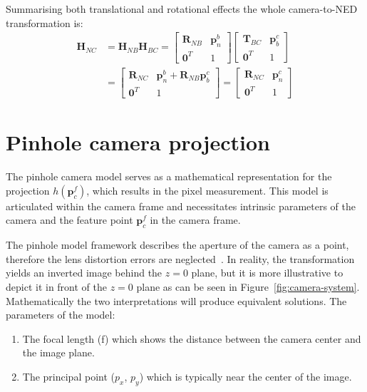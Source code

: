 Summarising both translational and rotational effects the whole camera-to-NED transformation is:
\begin{equation}
\begin{aligned}
    \mathbf{H}_{NC}&=\mathbf{H}_{NB}\mathbf{H}_{BC} = 
    \begin{bmatrix}
        \mathbf{R}_{NB} & \mathbf{p}_{n}^b\\
        \mathbf{0}^T & 1
    \end{bmatrix} 
    \begin{bmatrix}
        \mathbf{T}_{BC} & \mathbf{p}_b^c\\
        \mathbf{0}^T & 1
    \end{bmatrix} \\ &=
    \begin{bmatrix}
        \mathbf{R}_{NC} & \mathbf{p}_n^b+\mathbf{R}_{NB}\mathbf{p}_b^c \\
        \mathbf{0}^T & 1
    \end{bmatrix} =
    \begin{bmatrix}
        \mathbf{R}_{NC} & \mathbf{p}_n^c \\
        \mathbf{0}^T & 1
    \end{bmatrix}
\end{aligned}
\label{eq:body2camera}
\end{equation}

\section{Pinhole camera projection}

The pinhole camera model serves as a mathematical representation for the projection $h(\mathbf{p}_c^f)$, which results in the pixel measurement. This model is articulated within the camera frame and necessitates intrinsic parameters of the camera and the feature point $\mathbf{p}_c^f$ in the camera frame. 

The pinhole model framework describes the aperture of the camera as a point, therefore the lens distortion errors are neglected~\cite{pinhole_wikipedia, stanford_camera_models}. In reality, the transformation yields an inverted image behind the $z=0$ plane, but it is more illustrative to depict it in front of the $z=0$ plane as can be seen in Figure~\ref{fig:camera-system}. Mathematically the two interpretations will produce equivalent solutions. The parameters of the model: 

\begin{enumerate}
    \item The focal length (f) which shows the distance between the camera center and the image plane.
    \item The principal point ($p_x$, $p_y$) which is typically near the center of the image.
\end{enumerate}

